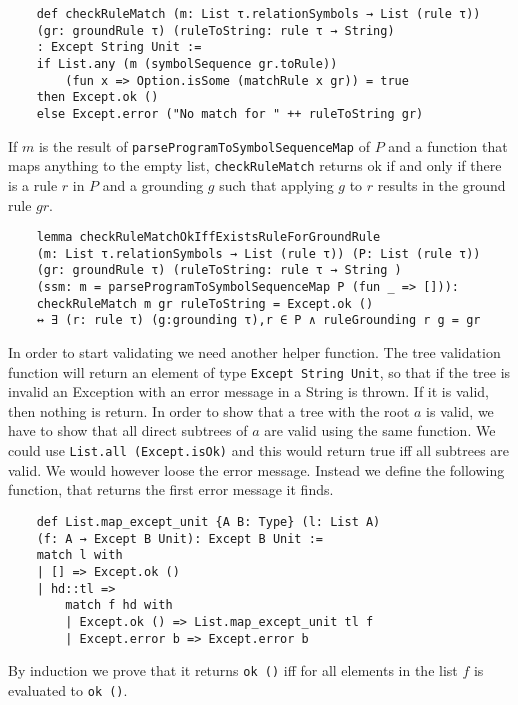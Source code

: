 \begin{lstlisting}
    def checkRuleMatch (m: List τ.relationSymbols → List (rule τ)) 
    (gr: groundRule τ) (ruleToString: rule τ → String)
    : Except String Unit :=
    if List.any (m (symbolSequence gr.toRule)) 
        (fun x => Option.isSome (matchRule x gr)) = true
    then Except.ok ()
    else Except.error ("No match for " ++ ruleToString gr)
\end{lstlisting}

If $m$ is the result of \texttt{parseProgramToSymbolSequenceMap} of $P$ and a function that maps anything to the empty list, \texttt{checkRuleMatch} returns ok if and only if there is a rule $r$ in $P$ and a grounding $g$ such that applying $g$ to $r$ results in the ground rule $gr$.

\begin{lstlisting}
    lemma checkRuleMatchOkIffExistsRuleForGroundRule 
    (m: List τ.relationSymbols → List (rule τ)) (P: List (rule τ)) 
    (gr: groundRule τ) (ruleToString: rule τ → String ) 
    (ssm: m = parseProgramToSymbolSequenceMap P (fun _ => [])): 
    checkRuleMatch m gr ruleToString = Except.ok () 
    ↔ ∃ (r: rule τ) (g:grounding τ),r ∈ P ∧ ruleGrounding r g = gr
\end{lstlisting}

In order to start validating we need another helper function. The tree validation function will return an element of type \texttt{Except String Unit}, so that if the tree is invalid an Exception with an error message in a String is thrown. If it is valid, then nothing is return. In order to show that a tree with the root $a$ is valid, we have to show that all direct subtrees of $a$ are valid using the same function. We could use \texttt{List.all (Except.isOk)} and this would return true iff all subtrees are valid. We would however loose the error message. Instead we define the following function, that returns the first error message it finds.

\begin{lstlisting}
    def List.map_except_unit {A B: Type} (l: List A) 
    (f: A → Except B Unit): Except B Unit :=
    match l with
    | [] => Except.ok ()
    | hd::tl =>
        match f hd with
        | Except.ok () => List.map_except_unit tl f
        | Except.error b => Except.error b
\end{lstlisting}

By induction we prove that it returns \texttt{ok ()} iff for all elements in the list $f$ is evaluated to \texttt{ok ()}.

